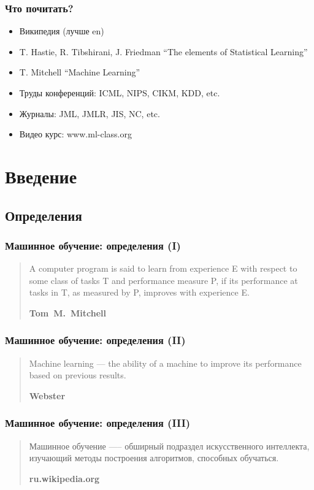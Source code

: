 \documentclass[14pt, fleqn, xcolor={dvipsnames, table}]{beamer}
\begin{document}
\begin{frame}
\frametitle{Что почитать?}
\begin{itemize}
  \item Википедия (лучше en)
\end{itemize}
\begin{itemize}
  \item T. Hastie, R. Tibshirani, J. Friedman “The elements of Statistical Learning”
  \item T. Mitchell “Machine Learning”
\end{itemize}
\begin{itemize}
  \item Труды конференций: ICML, NIPS, CIKM, KDD, etc.
  \item Журналы: JML, JMLR, JIS, NC, etc.
  \item Видео курс: www.ml-class.org
\end{itemize}
\end{frame}

\section{Введение}

\subsection{Определения}

\begin{frame}
\frametitle{Машинное обучение: определения (I)}
\begin{quote}
A computer program is said to learn from experience E with respect to some class of tasks T and performance measure P, if its performance at tasks in T, as measured by P, improves with experience E.
\begin{flushright}\textbf{Tom~M.~Mitchell}\end{flushright}
\end{quote}
\end{frame}
\begin{frame}
\frametitle{Машинное обучение: определения (II)}
\begin{quote}
Machine learning --- the ability of a machine to improve its performance based on previous results.
\begin{flushright}\textbf{Webster}\end{flushright}
\end{quote}
\end{frame}
\begin{frame}
\frametitle{Машинное обучение: определения (III)}
\begin{quote}
Машинное обучение —-- обширный подраздел искусственного интеллекта, изучающий методы построения алгоритмов, способных обучаться.
\begin{flushright}\textbf{ru.wikipedia.org}\end{flushright}
\end{quote}
\end{frame}
\end{document}

